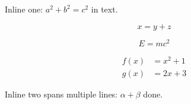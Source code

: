 \documentclass{article}
\begin{document}
Inline one: $a^2 + b^2 = c^2$ in text.

\[
  x = y + z
\]

\begin{equation}
E = mc^2
\end{equation}

\begin{align}
f(x) &= x^2 + 1 \\
g(x) &= 2x + 3
\end{align}

Inline two spans
multiple lines: $\alpha +
\beta$ done.
\end{document}

